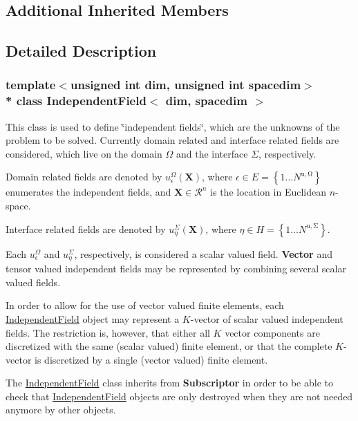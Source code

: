 \subsection*{Additional Inherited Members}


\subsection{Detailed Description}
\subsubsection*{template$<$unsigned int dim, unsigned int spacedim$>$\\*
class Independent\+Field$<$ dim, spacedim $>$}

This class is used to define \char`\"{}independent fields\char`\"{}, which are the unknowns of the problem to be solved. Currently domain related and interface related fields are considered, which live on the domain $\Omega$ and the interface $\Sigma$, respectively.

Domain related fields are denoted by $u^\Omega_\epsilon(\boldsymbol{X})$, where $\epsilon \in E=\left\{1 \hdots N^\mathrm{u,\Omega}\right\}$ enumerates the independent fields, and $\boldsymbol{X} \in \mathcal{R}^n$ is the location in Euclidean $n$-\/space.

Interface related fields are denoted by $u^\Sigma_\eta(\boldsymbol{X})$, where $\eta \in H=\left\{1 \hdots N^\mathrm{u,\Sigma}\right\}$.

Each $u^\Omega_\epsilon$ and $u^\Sigma_\eta$, respectively, is considered a scalar valued field. {\bf Vector} and tensor valued independent fields may be represented by combining several scalar valued fields.

In order to allow for the use of vector valued finite elements, each \hyperlink{class_independent_field}{Independent\+Field} object may represent a $K$-\/vector of scalar valued independent fields. The restriction is, however, that either all $K$ vector components are discretized with the same (scalar valued) finite element, or that the complete $K$-\/vector is discretized by a single (vector valued) finite element.

The \hyperlink{class_independent_field}{Independent\+Field} class inherits from {\bf Subscriptor} in order to be able to check that \hyperlink{class_independent_field}{Independent\+Field} objects are only destroyed when they are not needed anymore by other objects.


